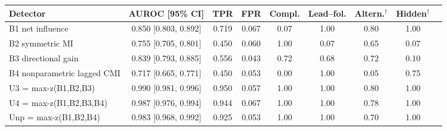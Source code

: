 \begin{tabular}{lcccccccc}
\toprule
Detector & AUROC [95\% CI] & TPR & FPR & Compl. & Lead--fol. & Altern.$^\dagger$ & Hidden$^\dagger$ \\
\midrule
B1 net influence & 0.850 [0.803, 0.892] & 0.719 & 0.067 & 0.07 & 1.00 & 0.80 & 1.00 \\
B2 symmetric MI & 0.755 [0.705, 0.801] & 0.450 & 0.060 & 1.00 & 0.07 & 0.65 & 0.07 \\
B3 directional gain & 0.839 [0.793, 0.885] & 0.556 & 0.043 & 0.72 & 0.68 & 0.72 & 0.10 \\
B4 nonparametric lagged CMI & 0.717 [0.665, 0.771] & 0.450 & 0.053 & 0.00 & 1.00 & 0.05 & 0.75 \\
\midrule
U3 = max-z(B1,B2,B3) & 0.990 [0.981, 0.996] & 0.950 & 0.057 & 1.00 & 1.00 & 0.80 & 1.00 \\
U4 = max-z(B1,B2,B3,B4) & 0.987 [0.976, 0.994] & 0.944 & 0.067 & 1.00 & 1.00 & 0.78 & 1.00 \\
Unp = max-z(B1,B2,B4) & 0.983 [0.968, 0.992] & 0.925 & 0.053 & 1.00 & 1.00 & 0.70 & 1.00 \\
\bottomrule
\end{tabular}